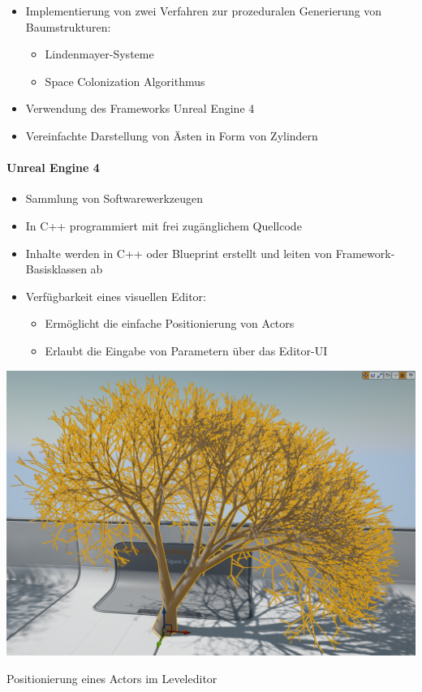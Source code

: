\begin{itemize}
	\item Implementierung von zwei Verfahren zur prozeduralen Generierung von Baumstrukturen:
	\begin{itemize}
		\item Lindenmayer-Systeme
		\item Space Colonization Algorithmus
	\end{itemize}
	\item Verwendung des Frameworks \glqq Unreal Engine 4\grqq
	\item Vereinfachte Darstellung von Ästen in Form von Zylindern
\end{itemize}

\newpage
{}
\paragraph{Unreal Engine 4\\}

\begin{itemize}
	\item Sammlung von Softwarewerkzeugen
	\item In C++ programmiert mit frei zugänglichem Quellcode
	\item Inhalte werden in C++ oder Blueprint erstellt und leiten von Framework-Basisklassen ab
	\item Verfügbarkeit eines visuellen Editor:
	\begin{itemize}
		\item Ermöglicht die einfache Positionierung von Actors
		\item Erlaubt die Eingabe von Parametern über das Editor-UI
	\end{itemize}
\end{itemize}

\newpage
\begin{center}
	\includegraphics[height=0.9\textheight]{images/CH1_EditorExample1.png}
	
	Positionierung eines Actors im Leveleditor
\end{center}

